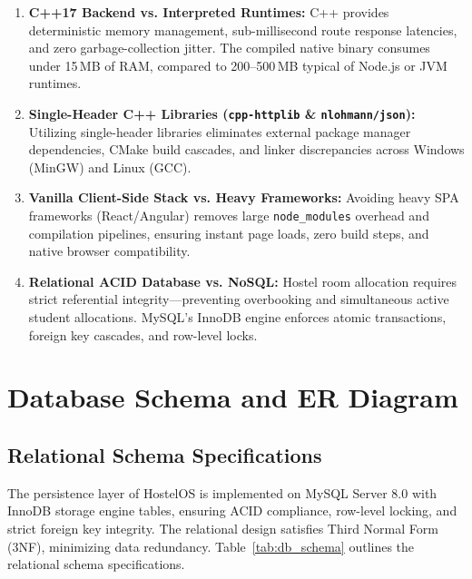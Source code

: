 \documentclass[12pt,a4paper]{article}
\begin{document}
\begin{enumerate}
    \item \textbf{C++17 Backend vs. Interpreted Runtimes:} C++ provides deterministic memory management, sub-millisecond route response latencies, and zero garbage-collection jitter. The compiled native binary consumes under 15\,MB of RAM, compared to 200--500\,MB typical of Node.js or JVM runtimes.
    
    \item \textbf{Single-Header C++ Libraries (\texttt{cpp-httplib} \& \texttt{nlohmann/json}):} Utilizing single-header libraries eliminates external package manager dependencies, CMake build cascades, and linker discrepancies across Windows (MinGW) and Linux (GCC).
    
    \item \textbf{Vanilla Client-Side Stack vs. Heavy Frameworks:} Avoiding heavy SPA frameworks (React/Angular) removes large \texttt{node\_modules} overhead and compilation pipelines, ensuring instant page loads, zero build steps, and native browser compatibility.
    
    \item \textbf{Relational ACID Database vs. NoSQL:} Hostel room allocation requires strict referential integrity—preventing overbooking and simultaneous active student allocations. MySQL's InnoDB engine enforces atomic transactions, foreign key cascades, and row-level locks.
\end{enumerate}

\section{Database Schema and ER Diagram}
\label{sec:db}

\subsection{Relational Schema Specifications}
\label{sec:db_specs}
The persistence layer of HostelOS is implemented on MySQL Server 8.0 with InnoDB storage engine tables, ensuring ACID compliance, row-level locking, and strict foreign key integrity. The relational design satisfies Third Normal Form (3NF), minimizing data redundancy. Table~\ref{tab:db_schema} outlines the relational schema specifications.
\end{document}
